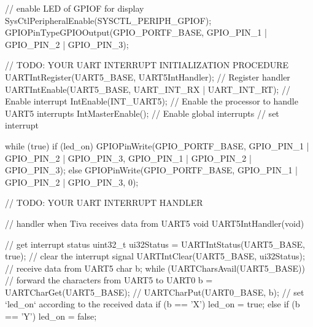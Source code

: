 \documentclass[12pt, a4paper]{article}
\begin{document}
\begin{code}
{    // enable LED of GPIOF for display
    SysCtlPeripheralEnable(SYSCTL_PERIPH_GPIOF);
    GPIOPinTypeGPIOOutput(GPIO_PORTF_BASE, GPIO_PIN_1 | GPIO_PIN_2 | GPIO_PIN_3);

    // TODO: YOUR UART INTERRUPT INITIALIZATION PROCEDURE
    UARTIntRegister(UART5_BASE, UART5IntHandler); // Register handler
    UARTIntEnable(UART5_BASE, UART_INT_RX | UART_INT_RT); // Enable interrupt
    IntEnable(INT_UART5); // Enable the processor to handle UART5 interrupts
    IntMasterEnable(); // Enable global interrupts
    // set interrupt

    while (true)
    {
        if (led_on) {
            GPIOPinWrite(GPIO_PORTF_BASE, GPIO_PIN_1 | GPIO_PIN_2 | GPIO_PIN_3, GPIO_PIN_1 | GPIO_PIN_2 | GPIO_PIN_3);
        }
        else {
            GPIOPinWrite(GPIO_PORTF_BASE, GPIO_PIN_1 | GPIO_PIN_2 | GPIO_PIN_3, 0);
        }
    }
}

// TODO: YOUR UART INTERRUPT HANDLER

// handler when Tiva receives data from UART5
void UART5IntHandler(void)
{
    // get interrupt status
        uint32_t ui32Status = UARTIntStatus(UART5_BASE, true);
        // clear the interrupt signal
        UARTIntClear(UART5_BASE, ui32Status);
        // receive data from UART5
        char b;
        while (UARTCharsAvail(UART5_BASE))
        {
            // forward the characters from UART5 to UART0
            b = UARTCharGet(UART5_BASE);
//            UARTCharPut(UART0_BASE, b);
        }
    // set `led_on` according to the received data
        if (b == 'X') {
            led_on = true;
        } else if (b == 'Y') {
           led_on = false;
       }

}
\end{code}
\pagebreak
\end{document}
